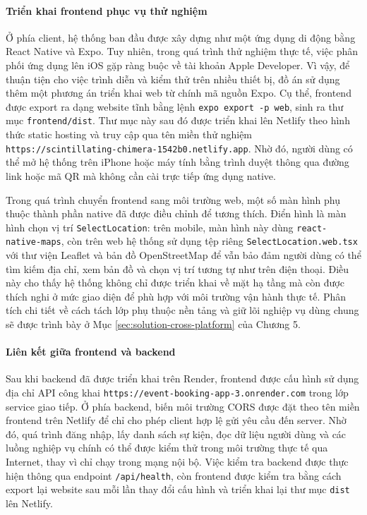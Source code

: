 \documentclass[../DoAn.tex]{subfiles}
\begin{document}
\paragraph{Triển khai frontend phục vụ thử nghiệm}\mbox{}

Ở phía client, hệ thống ban đầu được xây dựng như một ứng dụng di động bằng React Native và Expo. Tuy nhiên, trong quá trình thử nghiệm thực tế, việc phân phối ứng dụng lên iOS gặp ràng buộc về tài khoản Apple Developer. Vì vậy, để thuận tiện cho việc trình diễn và kiểm thử trên nhiều thiết bị, đồ án sử dụng thêm một phương án triển khai web từ chính mã nguồn Expo. Cụ thể, frontend được export ra dạng website tĩnh bằng lệnh \texttt{expo export -p web}, sinh ra thư mục \texttt{frontend/dist}. Thư mục này sau đó được triển khai lên Netlify theo hình thức static hosting và truy cập qua tên miền thử nghiệm \texttt{https://scintillating-chimera-1542b0.netlify.app}. Nhờ đó, người dùng có thể mở hệ thống trên iPhone hoặc máy tính bằng trình duyệt thông qua đường link hoặc mã \gls{QR} mà không cần cài trực tiếp ứng dụng native.

Trong quá trình chuyển frontend sang môi trường web, một số màn hình phụ thuộc thành phần native đã được điều chỉnh để tương thích. Điển hình là màn hình chọn vị trí \texttt{SelectLocation}: trên mobile, màn hình này dùng \texttt{react-native-maps}, còn trên web hệ thống sử dụng tệp riêng \texttt{SelectLocation.web.tsx} với thư viện Leaflet và bản đồ OpenStreetMap để vẫn bảo đảm người dùng có thể tìm kiếm địa chỉ, xem bản đồ và chọn vị trí tương tự như trên điện thoại. Điều này cho thấy hệ thống không chỉ được triển khai về mặt hạ tầng mà còn được thích nghi ở mức giao diện để phù hợp với môi trường vận hành thực tế. Phân tích chi tiết về cách tách lớp phụ thuộc nền tảng và giữ lõi nghiệp vụ dùng chung sẽ được trình bày ở Mục \ref{sec:solution-cross-platform} của Chương 5.

\paragraph{Liên kết giữa frontend và backend}\mbox{}

Sau khi backend đã được triển khai trên Render, frontend được cấu hình sử dụng địa chỉ \gls{API} công khai \texttt{https://event-booking-app-3.onrender.com} trong lớp service giao tiếp. Ở phía backend, biến môi trường \gls{CORS} được đặt theo tên miền frontend trên Netlify để chỉ cho phép client hợp lệ gửi yêu cầu đến server. Nhờ đó, quá trình đăng nhập, lấy danh sách sự kiện, đọc dữ liệu người dùng và các luồng nghiệp vụ chính có thể được kiểm thử trong môi trường thực tế qua Internet, thay vì chỉ chạy trong mạng nội bộ. Việc kiểm tra backend được thực hiện thông qua endpoint \texttt{/api/health}, còn frontend được kiểm tra bằng cách export lại website sau mỗi lần thay đổi cấu hình và triển khai lại thư mục \texttt{dist} lên Netlify.
\end{document}
